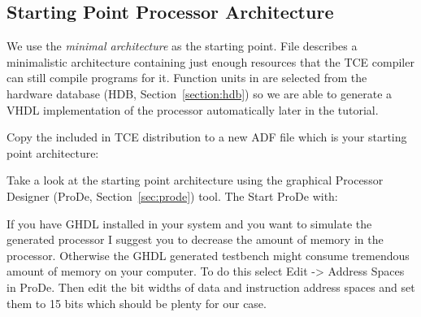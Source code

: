 \documentclass[twoside]{tceusermanual}
\begin{document}
% 
% 
% 

\subsection{Starting Point Processor Architecture}

We use the {\em minimal architecture} as the starting point. File
 describes a minimalistic architecture containing
just enough resources that the TCE compiler can still compile programs for it. 
Function units in  are selected from the hardware
database (HDB, Section~\ref{section:hdb}) so we are able to generate a VHDL
implementation of the processor automatically later in the tutorial.

Copy the  included in TCE distribution to a new
ADF file which is your starting point architecture:


Take a look at the starting point architecture using the graphical Processor
Designer (ProDe, Section~\ref{sec:prode}) tool. The Start ProDe with:


If you have GHDL installed in your system and you want to simulate the
generated processor I suggest you to decrease the amount of memory in the
processor. Otherwise the GHDL generated testbench might consume tremendous
amount of memory on your computer. To do this select Edit -> Address Spaces
in ProDe. Then edit the bit widths of data and instruction address spaces and
set them to 15 bits which should be plenty for our case.
\end{document}
